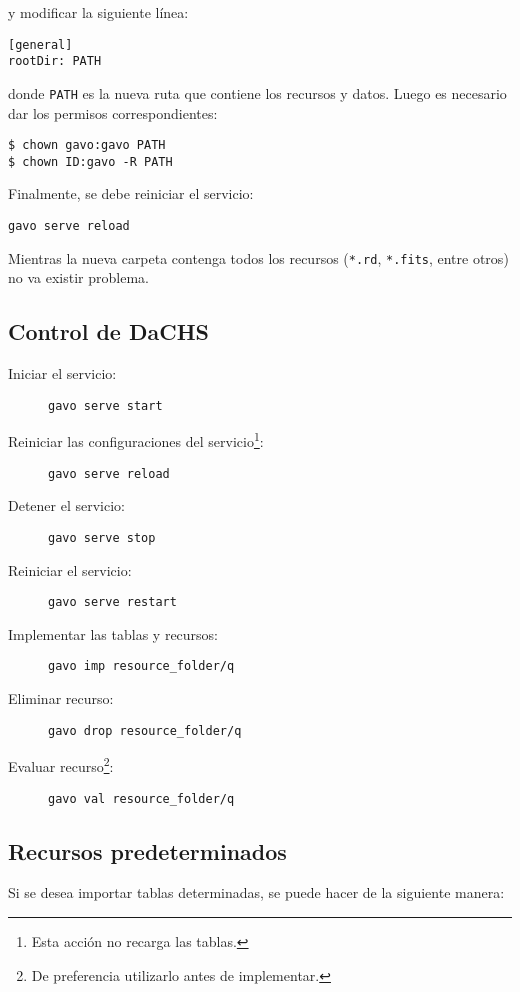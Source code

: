\noindent y modificar la siguiente línea:

\begin{verbatim}
[general]
rootDir: PATH
\end{verbatim}

\noindent donde \verb;PATH; es la nueva ruta que contiene los recursos y datos. Luego es necesario dar los permisos correspondientes:

\begin{verbatim}
$ chown gavo:gavo PATH
$ chown ID:gavo -R PATH
\end{verbatim}

Finalmente, se debe reiniciar el servicio:

\begin{verbatim}
gavo serve reload
\end{verbatim}

Mientras la nueva carpeta contenga todos los recursos (\verb;*.rd;, \verb;*.fits;, entre otros) no va existir problema.

\subsection*{Control de DaCHS}

\begin{description}
	\item[Iniciar el servicio:] \verb;gavo serve start;
	\item[Reiniciar las configuraciones del servicio\footnote{Esta acción no recarga las tablas.}:] \verb;gavo serve reload;
	\item[Detener el servicio:] \verb;gavo serve stop;
	\item[Reiniciar el servicio:] \verb;gavo serve restart;
	\item[Implementar las tablas y recursos:] \verb;gavo imp resource_folder/q;
	\item[Eliminar recurso:] \verb;gavo drop resource_folder/q;
	\item[Evaluar recurso\footnote{De preferencia utilizarlo antes de implementar.}:] \verb;gavo val resource_folder/q;
\end{description}

\subsection*{Recursos predeterminados}

Si se desea importar tablas determinadas, se puede hacer de la siguiente manera:

